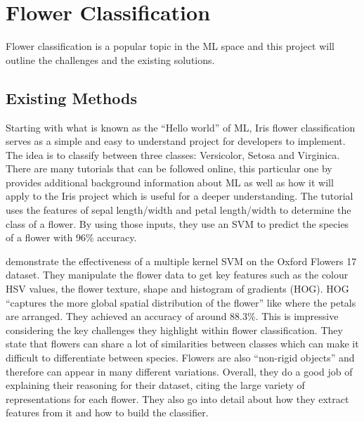 \documentclass[12pt,a4paper]{report}
\begin{document}
\section{Flower Classification}

Flower classification is a popular topic in the ML space and this project will outline the challenges and the existing solutions.

\subsection{Existing Methods}

\label{subsec:existing}

Starting with what is known as the “Hello world” of ML, Iris flower classification serves as a simple and easy to 
understand project for developers to implement. The idea is to classify between three classes: Versicolor, Setosa and 
Virginica. There are many tutorials that can be followed online, this particular one by \citet{DataFlairND}
provides additional background information about ML as well as how it will apply to the Iris project which is useful for
a deeper understanding. The tutorial uses the features of sepal length/width and petal length/width to determine the class of
a flower. By using those inputs, they use an SVM to predict the species of a flower with 96\% accuracy.

\par

\citet{Nilsback2008} demonstrate the effectiveness of a multiple kernel SVM on the Oxford Flowers 17 dataset. 
They manipulate the flower data to get key features such as the colour HSV values, the flower texture, shape and 
histogram of gradients (HOG). HOG “captures the more global spatial distribution of the flower” like where the 
petals are arranged. They achieved an accuracy of around 88.3\%. This is impressive considering the key challenges they 
highlight within flower classification. They state that flowers can share a lot of similarities between classes which 
can make it difficult to differentiate between species. Flowers are also “non-rigid objects” and therefore can appear in
many different variations. Overall, they do a good job of explaining their reasoning for their dataset, citing the 
large variety of representations for each flower. They also go into detail about how they extract features from it 
and how to build the classifier.

\par
\end{document}
